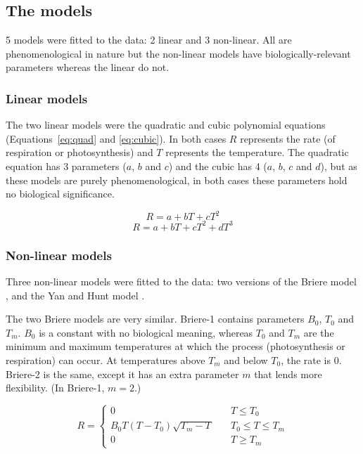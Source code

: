 \documentclass[11pt, a4paper]{article}
\begin{document}
	\subsection{The models}
	5 models were fitted to the data: 2 linear and 3 non-linear. All are phenomenological in nature but the non-linear models have biologically-relevant parameters whereas the linear do not. 
	
	\subsubsection*{Linear models}	
	The two linear models were the quadratic and cubic polynomial equations (Equations~\ref{eq:quad} and \ref{eq:cubic}). In both cases $R$ represents the rate (of respiration or photosynthesis) and $T$ represents the temperature. The quadratic equation has 3 parameters ($a$, $b$ and $c$) and the cubic has 4 ($a$, $b$, $c$ and $d$), but as these models are purely phenomenological, in both cases these parameters hold no biological significance.
	
	\begin{equation} \label{eq:quad}
	R = a + bT + cT^2
	\end{equation}
	\begin{equation} \label{eq:cubic}
	R = a + bT + cT^2 + dT^3
	\end{equation}
	
	\subsubsection*{Non-linear models}
	Three non-linear models were fitted to the data: two versions of the Briere model \cite{briereNovelRateModel1999}, and the Yan and Hunt model \cite{yanEquationModellingTemperature1999}.
	
	The two Briere models are very similar. Briere-1 contains parameters $B_0$, $T_0$ and $T_m$. $B_0$ is a constant with no biological meaning, whereas $T_0$ and $T_m$ are the minimum and maximum temperatures at which the process (photosynthesis or respiration) can occur. At temperatures above $T_m$ and below $T_0$, the rate is 0. Briere-2 is the same, except it has an extra parameter $m$ that lends more flexibility. (In Briere-1, $m = 2$.)
		
	\begin{equation} \label{eq:briere}
	R = \left\{
			\begin{array}{ll}
			0 & \quad T \leq T_0 \\
            B_0 T (T-T_0) \sqrt{T_m - T} & \quad T_0 \leq T \leq T_m \\
            0 & \quad T \geq T_m
			\end{array}
	\right.
	\end{equation}
	
\end{document}
